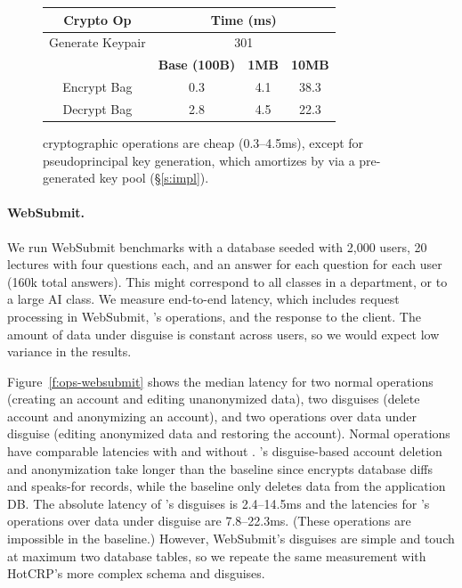 \begin{figure}[t]
\centering
\begin{tabular}{ c c c c }
    \textbf{Crypto Op} & \multicolumn{3}{c}{\textbf{Time (ms)}}\\
\hline
    Generate Keypair & \multicolumn{3}{c}{301}\\
\hline
    & \textbf{Base (100B)} & \textbf{1MB} & \textbf{10MB}\\
    Encrypt Bag & 0.3 & 4.1 & 38.3\\
    Decrypt Bag & 2.8 & 4.5 & 22.3\\
\end{tabular}
  \caption{\sys cryptographic operations are cheap (0.3--4.5ms), except for
    pseudoprincipal key generation, which \sys amortizes by via a pre-generated
    key pool (\S\ref{s:impl}).}
  \label{f:opstats}
\end{figure}

\paragraph{WebSubmit.}
%
We run WebSubmit benchmarks with a database seeded with 2,000 users, 20
lectures with four questions each, and an answer for each question for
each user (160k total answers).
%
This might correspond to all classes in a department, or to a large AI class.
%
We measure end-to-end latency, which includes request processing in WebSubmit,
\sys's operations, and the response to the client.
%
The amount of data under disguise is constant across users, so we would expect
low variance in the results.
%

%
Figure~\ref{f:ops-websubmit} shows the median latency for two normal operations
(creating an account and editing unanonymized data), two disguises (delete account
and anonymizing an account), and two operations over data under disguise (editing
anonymized data and restoring the account).
%
Normal operations have comparable latencies with and without \sys.
%
\sys's disguise-based account deletion and anonymization take longer than the
baseline since \sys encrypts database diffs and speaks-for records, while
the baseline only deletes data from the application DB.
%
The absolute latency of \sys's disguises is 2.4--14.5ms and the latencies for
\sys's operations over data under disguise are 7.8--22.3ms.
%
(These operations are impossible in the baseline.)
%
However, WebSubmit's disguises are simple and touch at maximum two database
tables, so we repeate the same measurement with HotCRP's more complex schema and
disguises.
%


